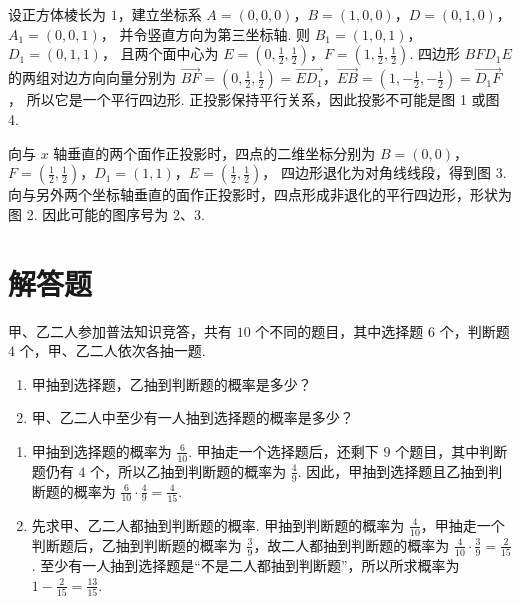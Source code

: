\begin{solution}
设正方体棱长为 \(1\)，建立坐标系
\(A=(0,0,0)\)，\(B=(1,0,0)\)，\(D=(0,1,0)\)，\(A_{1}=(0,0,1)\)，
并令竖直方向为第三坐标轴. 则
\(B_{1}=(1,0,1)\)，\(D_{1}=(0,1,1)\)，
且两个面中心为
\(E=\left(0,\frac{1}{2},\frac{1}{2}\right)\)，\(F=\left(1,\frac{1}{2},\frac{1}{2}\right)\).
四边形 \(BFD_{1}E\) 的两组对边方向向量分别为
\(\overrightarrow{BF}=\left(0,\frac{1}{2},\frac{1}{2}\right)=\overrightarrow{ED_{1}}\)，\(\overrightarrow{EB}=\left(1,-\frac{1}{2},-\frac{1}{2}\right)=\overrightarrow{D_{1}F}\)，
所以它是一个平行四边形. 正投影保持平行关系，因此投影不可能是图 1 或图 4.

向与 \(x\) 轴垂直的两个面作正投影时，四点的二维坐标分别为
\(B=(0,0)\)，\(F=\left(\frac{1}{2},\frac{1}{2}\right)\)，\(D_{1}=(1,1)\)，\(E=\left(\frac{1}{2},\frac{1}{2}\right)\)，
四边形退化为对角线线段，得到图 3. 向与另外两个坐标轴垂直的面作正投影时，四点形成非退化的平行四边形，形状为图 2. 因此可能的图序号为 2、3.
\end{solution}

\section{解答题}
\begin{problem}
甲、乙二人参加普法知识竞答，共有 \(10\) 个不同的题目，其中选择题 \(6\) 个，判断题 \(4\) 个，甲、乙二人依次各抽一题.

\begin{enumerate}
\item 甲抽到选择题，乙抽到判断题的概率是多少？
\item 甲、乙二人中至少有一人抽到选择题的概率是多少？
\end{enumerate}
\end{problem}

\begin{solution}
\begin{enumerate}
\item 甲抽到选择题的概率为 \(\frac{6}{10}\). 甲抽走一个选择题后，还剩下 \(9\) 个题目，其中判断题仍有 \(4\) 个，所以乙抽到判断题的概率为 \(\frac{4}{9}\). 因此，甲抽到选择题且乙抽到判断题的概率为
\(\frac{6}{10}\cdot\frac{4}{9}=\frac{4}{15}\).
\item 先求甲、乙二人都抽到判断题的概率. 甲抽到判断题的概率为 \(\frac{4}{10}\)，甲抽走一个判断题后，乙抽到判断题的概率为 \(\frac{3}{9}\)，故二人都抽到判断题的概率为
\(\frac{4}{10}\cdot\frac{3}{9}=\frac{2}{15}\).
至少有一人抽到选择题是“不是二人都抽到判断题”，所以所求概率为
\(1-\frac{2}{15}=\frac{13}{15}\).
\end{enumerate}
\end{solution}

